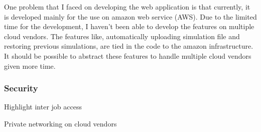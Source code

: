 \vspace{1cm}



One problem that I faced on developing the web application is that currently, it is developed mainly for the use on amazon web service (AWS). Due to the limited time for the development, I haven't been able to develop the features on multiple cloud vendors. The features like, automatically uploading simulation file and restoring previous simulations, are tied in the code to the amazon infrastructure. It should be possible to abstract these features to handle multiple cloud vendors given more time.

\subsubsection{Security}

Highlight inter job access

Private networking on cloud vendors





